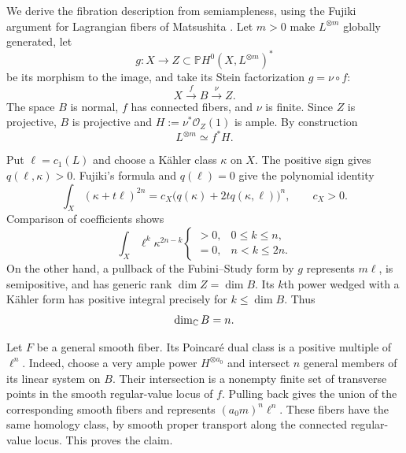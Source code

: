 We derive the fibration description from semiampleness, using the
Fujiki argument for Lagrangian fibers of Matsushita
\cite{Matsushita1999,MatsushitaAddendum}.  Let $m>0$ make $L^{\otimes m}$ globally
generated, let
\[
 g:X\longrightarrow Z\subset\mathbb P H^0(X,L^{\otimes m})^*
\]
be its morphism to the image, and take its Stein factorization
$g=\nu\circ f$:
\[
                   X\xrightarrow{\ f\ }B\xrightarrow{\ \nu\ }Z.
\]
The space $B$ is normal, $f$ has connected fibers, and $\nu$ is
finite.  Since $Z$ is projective, $B$ is projective and
$H:=\nu^*\mathcal O_Z(1)$ is ample.  By construction
\begin{equation}
                         L^{\otimes m}\simeq f^*H.
\label{eq:rotation-ample-pullback}
\end{equation}

Put $\ell=c_1(L)$ and choose a K\"ahler class $\kappa$ on $X$.
The positive sign gives $q(\ell,\kappa)>0$.  Fujiki's formula
and $q(\ell)=0$ give the polynomial identity
\begin{equation}
 \int_X(\kappa+t\ell)^{2n}
       =c_X\bigl(q(\kappa)+2tq(\kappa,\ell)\bigr)^n,
       \qquad c_X>0.
\label{eq:rotation-numerical-dimension}
\end{equation}
Comparison of coefficients shows
\[
 \int_X\ell^k\kappa^{2n-k}
 \begin{cases}
 >0,&0\le k\le n,\\
 =0,&n<k\le2n.
 \end{cases}
\]
On the other hand, a pullback of the Fubini--Study form by $g$
represents $m\ell$, is semipositive, and has generic rank
$\dim Z=\dim B$.  Its $k$th power wedged with a K\"ahler form
has positive integral precisely for $k\le\dim B$.  Thus
\begin{equation}
                              \dim_{\mathbb C}B=n.
\label{eq:rotation-base-dimension}
\end{equation}

Let $F$ be a general smooth fiber.  Its Poincar\'e dual class
is a positive multiple of $\ell^n$.  Indeed, choose a very ample
power $H^{\otimes a_0}$ and intersect $n$ general members of
its linear system on $B$.  Their intersection is a nonempty
finite set of transverse points in the smooth regular-value
locus of $f$.  Pulling back gives the union of the corresponding
smooth fibers and represents $(a_0m)^n\ell^n$.  These fibers
have the same homology class, by smooth proper transport along
the connected regular-value locus.  This proves the claim.

